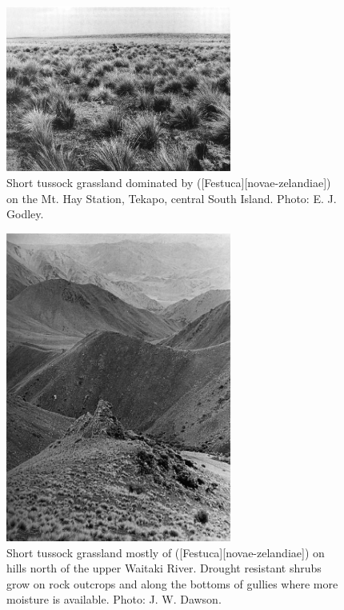 \begin{figure}
	\includegraphics[width=0.66\textwidth]{graphics/figure81short-tussock.jpg}
	\centering
		\caption[Short tussock grassland dominated by fescue-tussock]{Short tussock grassland dominated by  ([Festuca][novae-zelandiae]) on the Mt.
		Hay Station, Tekapo, central South Island.
		Photo:  E. J. Godley.}%
		\label{fig:81short-tussock}
\end{figure}
\begin{figure}
	\includegraphics[width=0.66\textwidth]{graphics/figure82short-tussock.jpg}
	\centering
		\caption[Short tussock grassland mostly of \emph{Festuca novae-zelandiae}]{Short tussock grassland mostly of  ([Festuca][novae-zelandiae]) on hills north of the upper Waitaki River.
		Drought resistant shrubs grow on rock outcrops and along the bottoms of gullies where more moisture is available.  Photo:  J. W. Dawson.}%
		\label{fig:82short-tussock}
\end{figure}
